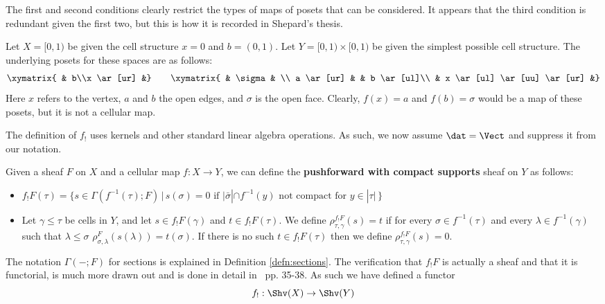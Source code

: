 \begin{rmk}
The first and second conditions clearly restrict the types of maps of posets that can be considered. It appears that the third condition is redundant given the first two, but this is how it is recorded in Shepard's thesis.
\end{rmk}
 
\begin{ex}
Let $X=[0,1)$ be given the cell structure $x=0$ and $b=(0,1)$. Let $Y=[0,1)\times [0,1)$ be given the simplest possible cell structure. The underlying posets for these spaces are as follows:
\[
  \xymatrix{ & b\\x \ar[ur] &} \qquad \xymatrix{ & \sigma & \\ a \ar[ur] & & b \ar[ul]\\ & x \ar[ul] \ar[uu] \ar[ur] &}
\]
Here $x$ refers to the vertex, $a$ and $b$ the open edges, and $\sigma$ is the open face. Clearly, $f(x)=a$ and $f(b)=\sigma$ would be a map of these posets, but it is not a cellular map.
\end{ex}

The definition of $f_!$ uses kernels and other standard linear algebra operations. As such, we now assume $\dat=\Vect$ and suppress it from our notation.

\begin{defn}
Given a sheaf $F$ on $X$ and a cellular map $f:X\to Y$, we can define the \textbf{pushforward with compact supports} sheaf on $Y$ as follows:
\begin{itemize}
 \item $f_!F(\tau)=\{s\in\Gamma(f^{-1}(\tau);F)\,|\,s(\sigma)=0\,\, \mathrm{if}\,\, |\bar{\sigma}|\cap f^{-1}(y)\,\,\mathrm{not}\,\,\mathrm{compact}\,\,\mathrm{for}\,\, y\in|\tau|\,\}$
\item Let $\gamma\leq \tau$ be cells in $Y$, and let $s\in f_!F(\gamma)$ and $t\in f_!F(\tau)$. We define $\rho^{f_!F}_{\tau,\gamma}(s)=t$ if for every $\sigma\in f^{-1}(\tau)$ and every $\lambda\in f^{-1}(\gamma)$ such that $\lambda\leq \sigma$ $\rho^F_{\sigma,\lambda}(s(\lambda))=t(\sigma)$. If there is no such $t\in f_!F(\tau)$ then we define $\rho^{f_!F}_{\tau,\gamma}(s)=0$.
\end{itemize}
The notation $\Gamma(-;F)$ for sections is explained in Definition \ref{defn:sections}. The verification that $f_!F$ is actually a sheaf and that it is functorial, is much more drawn out and is done in detail in~\cite{shepard} pp. 35-38. As such we have defined a functor
\[
	f_!:\Shv(X)\to\Shv(Y)
\]
\end{defn}

